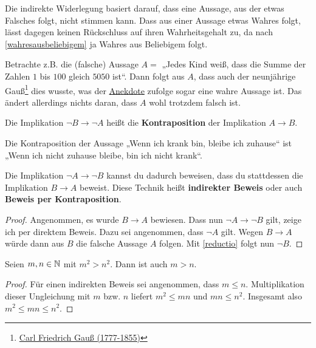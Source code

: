 \begin{bem}[*]
    Die indirekte Widerlegung basiert darauf, dass eine Aussage, aus der etwas Falsches folgt, nicht stimmen kann. Dass aus einer Aussage etwas Wahres folgt, lässt dagegen keinen Rückschluss auf ihren Wahrheitsgehalt zu, da nach \cref{wahresausbeliebigem} ja Wahres aus Beliebigem folgt.
    
    Betrachte z.B. die (falsche) Aussage $A=$ „Jedes Kind weiß, dass die Summe der Zahlen $1$ bis $100$ gleich $5050$ ist“. Dann folgt aus $A$, dass auch der neunjährige Gauß\footnote{\href{https://de.wikipedia.org/wiki/Carl_Friedrich_Gau\%C3\%9F}{Carl Friedrich Gauß (1777-1855)}} dies wusste, was der \href{https://de.wikipedia.org/wiki/Gau\%C3\%9Fsche_Summenformel#Geschichte_der_Bezeichnung}{Anekdote} zufolge sogar eine wahre Aussage ist. Das ändert allerdings nichts daran, dass $A$ wohl trotzdem falsch ist.
\end{bem}


\begin{defin}[Kontraposition] 
    Die Implikation $\neg B \to \neg A$ heißt die \textbf{Kontraposition} der Implikation $A\to B$.
\end{defin}


\begin{bsp}
    Die Kontraposition der Aussage „Wenn ich krank bin, bleibe ich zuhause“ ist „Wenn ich nicht zuhause bleibe, bin ich nicht krank“.
\end{bsp}


\begin{satz} \label{indirekterbeweis} 
    Die Implikation $\neg A\to \neg B$ kannst du dadurch beweisen, dass du stattdessen die Implikation $B\to A$ beweist. Diese Technik heißt \textbf{indirekter Beweis} oder auch \textbf{Beweis per Kontraposition}.
\end{satz}
\begin{proof}
    Angenommen, es wurde $B\to A$ bewiesen. Dass nun $\neg A\to \neg B$ gilt, zeige ich per direktem Beweis. Dazu sei angenommen, dass $\neg A$ gilt. Wegen $B\to A$ würde dann aus $B$ die falsche Aussage $A$ folgen. Mit \cref{reductio} folgt nun $\neg B$.
\end{proof}


\begin{bsp}
    Seien $m,n\in \mathbb N$ mit $m^2>n^2$. Dann ist auch $m>n$.
\end{bsp}
\begin{proof}
    Für einen indirekten Beweis sei angenommen, dass $m\le n$. Multiplikation dieser Ungleichung mit $m$ bzw. $n$ liefert $m^2\le mn$ und $mn\le n^2$. Insgesamt also $m^2\le mn\le n^2$.
\end{proof}
  

